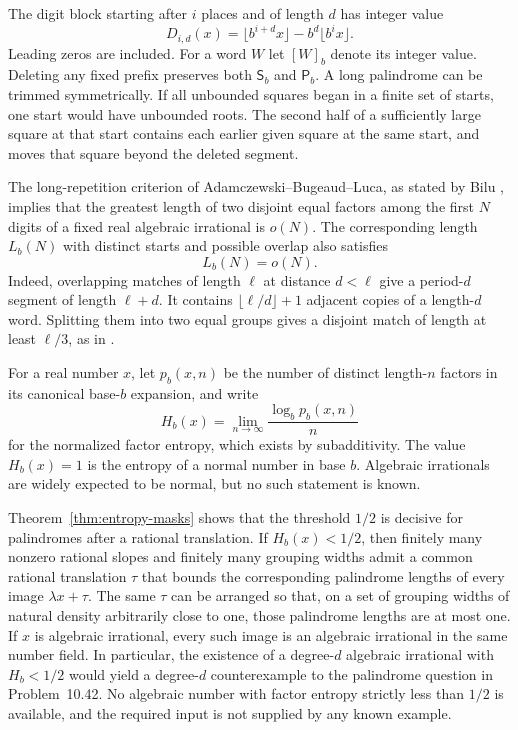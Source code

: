 \documentclass[11pt,reqno,a4paper]{amsart}
\theoremstyle{remark}
\begin{document}
The digit block starting after $i$ places and of length $d$ has integer value
\begin{equation}\label{eq:digitblock}
 D_{i,d}(x)=\lfloor b^{i+d}x\rfloor-b^d\lfloor b^i x\rfloor.
\end{equation}
Leading zeros are included. For a word $W$ let $[W]_b$ denote its integer value. Deleting any fixed prefix preserves both $\mathsf S_b$ and $\mathsf P_b$. A long palindrome can be trimmed symmetrically. If all unbounded squares began in a finite set of starts, one start would have unbounded roots. The second half of a sufficiently large square at that start contains each earlier given square at the same start, and moves that square beyond the deleted segment.

The long-repetition criterion of Adamczewski--Bugeaud--Luca, as stated by Bilu \cite[Theorem~3.3, p.~8]{Bilu}, implies that the greatest length of two disjoint equal factors among the first $N$ digits of a fixed real algebraic irrational is $o(N)$. The corresponding length $L_b(N)$ with distinct starts and possible overlap also satisfies
\begin{equation}\label{eq:known-early}
 L_b(N)=o(N).
\end{equation}
Indeed, overlapping matches of length $\ell$ at distance $d<\ell$ give a period-$d$ segment of length $\ell+d$. It contains $\lfloor\ell/d\rfloor+1$ adjacent copies of a length-$d$ word. Splitting them into two equal groups gives a disjoint match of length at least $\ell/3$, as in \cite[Lemma~3.4]{Bilu}.

For a real number $x$, let $p_b(x,n)$ be the number of distinct length-$n$ factors in its canonical base-$b$ expansion, and write
\[
 H_b(x)=\lim_{n\to\infty}\frac{\log_b p_b(x,n)}{n}
\]
for the normalized factor entropy, which exists by subadditivity. The value $H_b(x)=1$ is the entropy of a normal number in base $b$. Algebraic irrationals are widely expected to be normal, but no such statement is known.

Theorem~\ref{thm:entropy-masks} shows that the threshold $1/2$ is decisive for palindromes after a rational translation. If $H_b(x)<1/2$, then finitely many nonzero rational slopes and finitely many grouping widths admit a common rational translation $\tau$ that bounds the corresponding palindrome lengths of every image $\lambda x+\tau$. The same $\tau$ can be arranged so that, on a set of grouping widths of natural density arbitrarily close to one, those palindrome lengths are at most one. If $x$ is algebraic irrational, every such image is an algebraic irrational in the same number field. In particular, the existence of a degree-$d$ algebraic irrational with $H_b<1/2$ would yield a degree-$d$ counterexample to the palindrome question in Problem~10.42. No algebraic number with factor entropy strictly less than $1/2$ is available, and the required input is not supplied by any known example.
\end{document}
